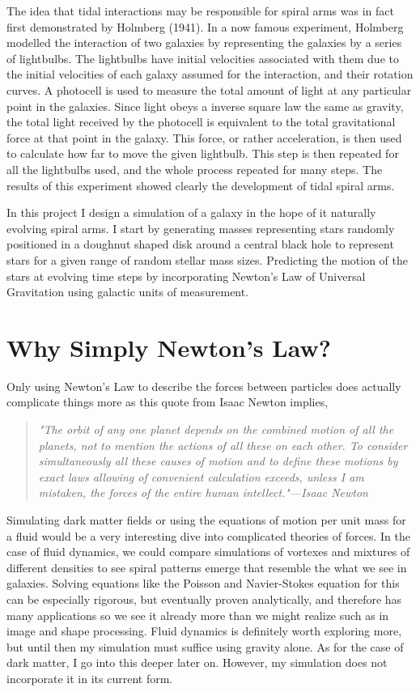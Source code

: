 \documentclass[11pt]{article}
\begin{document}
The idea that tidal interactions may be responsible for spiral arms was in fact first demonstrated by Holmberg (1941). In a now famous experiment, Holmberg modelled the interaction of two galaxies by representing the galaxies by a series of lightbulbs. The lightbulbs have initial velocities associated with them due to the initial velocities of each galaxy assumed for the interaction, and their rotation curves. A photocell is used to measure the total amount of light at any particular point in the galaxies. Since light obeys a inverse square law the same as gravity, the total light received by the photocell is equivalent to the total gravitational force at that point in the galaxy. This force, or rather acceleration, is then used to calculate how far to move the given lightbulb. This step is then repeated for all the lightbulbs used, and the whole process repeated for many steps. The results of this experiment showed clearly the development of tidal spiral arms.

In this project I design a simulation of a galaxy in the hope of it naturally evolving spiral arms. I start by generating masses representing stars randomly positioned in a doughnut shaped disk around a central black hole to represent stars for a given range of random stellar mass sizes. Predicting the motion of the stars at evolving time steps by incorporating Newton's Law of Universal Gravitation using galactic units of measurement.

\section{Why Simply Newton's Law?}
Only using Newton's Law to describe the forces between particles does actually complicate things more as this quote from Isaac Newton implies,

\begin{quote}
\textit{"The orbit of any one planet depends on the combined motion of all the planets, not to mention the actions of all these on each other. To consider simultaneously all these causes of motion and to define these motions by exact laws allowing of convenient calculation exceeds, unless I am mistaken, the forces of the entire human intellect."—Isaac Newton}
\end{quote}

Simulating dark matter fields or using the equations of motion per unit mass for a fluid would be a very interesting dive into complicated theories of forces. In the case of fluid dynamics, we could compare simulations of vortexes and mixtures of different densities to see spiral patterns emerge that resemble the what we see in galaxies. Solving equations like the Poisson and Navier-Stokes equation for this can be especially rigorous, but eventually proven analytically, and therefore has many applications so we see it already more than we might realize such as in image and shape processing. Fluid dynamics is definitely worth exploring more, but until then my simulation must suffice using gravity alone. As for the case of dark matter, I go into this deeper later on. However, my simulation does not incorporate it in its current form. 
\end{document}
